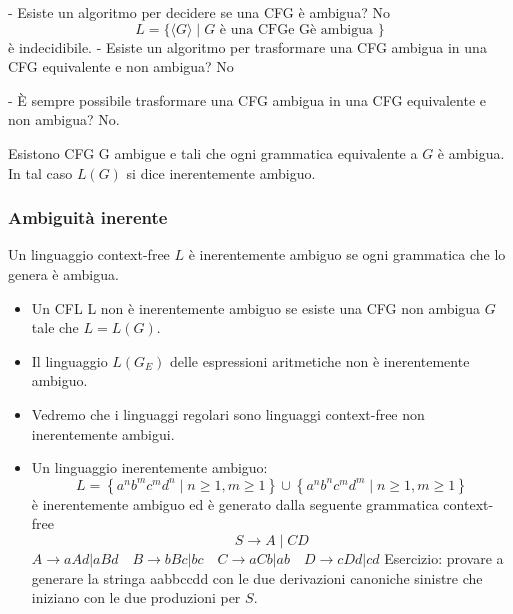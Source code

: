 - Esiste un algoritmo per decidere se una CFG è ambigua?
No
$$
L=\{\langle G\rangle \mid G \text { è una CFGe Gè ambigua }\}
$$
è indecidibile.
- Esiste un algoritmo per trasformare una CFG ambigua in una CFG equivalente e non ambigua?
No

- È sempre possibile trasformare una CFG ambigua in una CFG equivalente e non ambigua?
No.

Esistono CFG G ambigue e tali che ogni grammatica equivalente a $G$ è ambigua.
In tal caso $L(G)$ si dice inerentemente ambiguo.

\subsubsection{Ambiguità inerente}

Un linguaggio context-free $L$ è inerentemente ambiguo se ogni grammatica che lo genera è ambigua.
\begin{itemize}
    \item Un CFL L non è inerentemente ambiguo se esiste una CFG non ambigua $G$ tale che $L=L(G)$.
    \item Il linguaggio $L\left(G_{E}\right)$ delle espressioni aritmetiche non è inerentemente ambiguo.
    \item Vedremo che i linguaggi regolari sono linguaggi context-free non inerentemente ambigui.
    \item Un linguaggio inerentemente ambiguo:
$$
L=\left\{a^{n} b^{m} c^{m} d^{n} \mid n \geq 1, m \geq 1\right\} \cup\left\{a^{n} b^{n} c^{m} d^{m} \mid n \geq 1, m \geq 1\right\}
$$
è inerentemente ambiguo ed è generato dalla seguente grammatica context-free
$$
S \rightarrow A \mid C D
$$
$A \rightarrow a A d|a B d \quad B \rightarrow b B c| b c \quad C \rightarrow a C b|a b \quad D \rightarrow c D d| c d$
Esercizio: provare a generare la stringa aabbccdd con le due derivazioni canoniche sinistre che iniziano con le due produzioni per $S$.
\end{itemize}

\let\cleardoublepage\clearpage
\subsubsection{}

